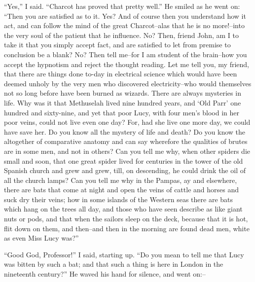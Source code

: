 \documentclass[12pt,openright]{book}
\begin{document}
“Yes,” I said. “Charcot has proved that pretty well.” He smiled as he went on: “Then you are satisfied as to it. Yes? And of course then you understand how it act, and can follow the mind of the great Charcot–alas that he is no more!–into the very soul of the patient that he influence. No? Then, friend John, am I to take it that you simply accept fact, and are satisfied to let from premise to conclusion be a blank? No? Then tell me–for I am student of the brain–how you accept the hypnotism and reject the thought reading. Let me tell you, my friend, that there are things done to-day in electrical science which would have been deemed unholy by the very men who discovered electricity–who would themselves not so long before have been burned as wizards. There are always mysteries in life. Why was it that Methuselah lived nine hundred years, and ‘Old Parr’ one hundred and sixty-nine, and yet that poor Lucy, with four men’s blood in her poor veins, could not live even one day? For, had she live one more day, we could have save her. Do you know all the mystery of life and death? Do you know the altogether of comparative anatomy and can say wherefore the qualities of brutes are in some men, and not in others? Can you tell me why, when other spiders die small and soon, that one great spider lived for centuries in the tower of the old Spanish church and grew and grew, till, on descending, he could drink the oil of all the church lamps? Can you tell me why in the Pampas, ay and elsewhere, there are bats that come at night and open the veins of cattle and horses and suck dry their veins; how in some islands of the Western seas there are bats which hang on the trees all day, and those who have seen describe as like giant nuts or pods, and that when the sailors sleep on the deck, because that it is hot, flit down on them, and then–and then in the morning are found dead men, white as even Miss Lucy was?”

“Good God, Professor!” I said, starting up. “Do you mean to tell me that Lucy was bitten by such a bat; and that such a thing is here in London in the nineteenth century?” He waved his hand for silence, and went on:–
\end{document}

